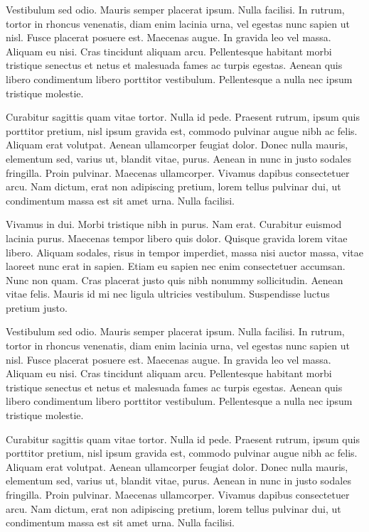 Vestibulum sed odio. Mauris semper placerat ipsum. Nulla facilisi. In rutrum, tortor in rhoncus venenatis, diam enim lacinia urna, vel egestas nunc sapien ut nisl. Fusce placerat posuere est. Maecenas augue. In gravida leo vel massa. Aliquam eu nisi. Cras tincidunt aliquam arcu. Pellentesque habitant morbi tristique senectus et netus et malesuada fames ac turpis egestas. Aenean quis libero condimentum libero porttitor vestibulum. Pellentesque a nulla nec ipsum tristique molestie.

Curabitur sagittis quam vitae tortor. Nulla id pede. Praesent rutrum, ipsum quis porttitor pretium, nisl ipsum gravida est, commodo pulvinar augue nibh ac felis. Aliquam erat volutpat. Aenean ullamcorper feugiat dolor. Donec nulla mauris, elementum sed, varius ut, blandit vitae, purus. Aenean in nunc in justo sodales fringilla. Proin pulvinar. Maecenas ullamcorper. Vivamus dapibus consectetuer arcu. Nam dictum, erat non adipiscing pretium, lorem tellus pulvinar dui, ut condimentum massa est sit amet urna. Nulla facilisi.

Vivamus in dui. Morbi tristique nibh in purus. Nam erat. Curabitur euismod lacinia purus. Maecenas tempor libero quis dolor. Quisque gravida lorem vitae libero. Aliquam sodales, risus in tempor imperdiet, massa nisi auctor massa, vitae laoreet nunc erat in sapien. Etiam eu sapien nec enim consectetuer accumsan. Nunc non quam. Cras placerat justo quis nibh nonummy sollicitudin. Aenean vitae felis. Mauris id mi nec ligula ultricies vestibulum. Suspendisse luctus pretium justo. 

Vestibulum sed odio. Mauris semper placerat ipsum. Nulla facilisi. In rutrum, tortor in rhoncus venenatis, diam enim lacinia urna, vel egestas nunc sapien ut nisl. Fusce placerat posuere est. Maecenas augue. In gravida leo vel massa. Aliquam eu nisi. Cras tincidunt aliquam arcu. Pellentesque habitant morbi tristique senectus et netus et malesuada fames ac turpis egestas. Aenean quis libero condimentum libero porttitor vestibulum. Pellentesque a nulla nec ipsum tristique molestie.

Curabitur sagittis quam vitae tortor. Nulla id pede. Praesent rutrum, ipsum quis porttitor pretium, nisl ipsum gravida est, commodo pulvinar augue nibh ac felis. Aliquam erat volutpat. Aenean ullamcorper feugiat dolor. Donec nulla mauris, elementum sed, varius ut, blandit vitae, purus. Aenean in nunc in justo sodales fringilla. Proin pulvinar. Maecenas ullamcorper. Vivamus dapibus consectetuer arcu. Nam dictum, erat non adipiscing pretium, lorem tellus pulvinar dui, ut condimentum massa est sit amet urna. Nulla facilisi.

